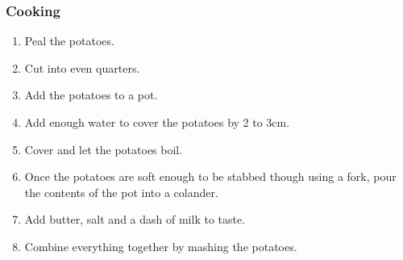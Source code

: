 \subsubsection{Cooking}
\begin{enumerate}
    \item Peal the potatoes.
    \item Cut into even quarters.
    \item Add the potatoes to a pot.
    \item Add enough water to cover the potatoes by 2 to 3cm.
    \item Cover and let the potatoes boil.
    \item Once the potatoes are soft enough to be stabbed though using a fork, pour the contents of the pot into a colander.
    \item Add butter, salt and a dash of milk to taste.
    \item Combine everything together by mashing the potatoes.
\end{enumerate}
